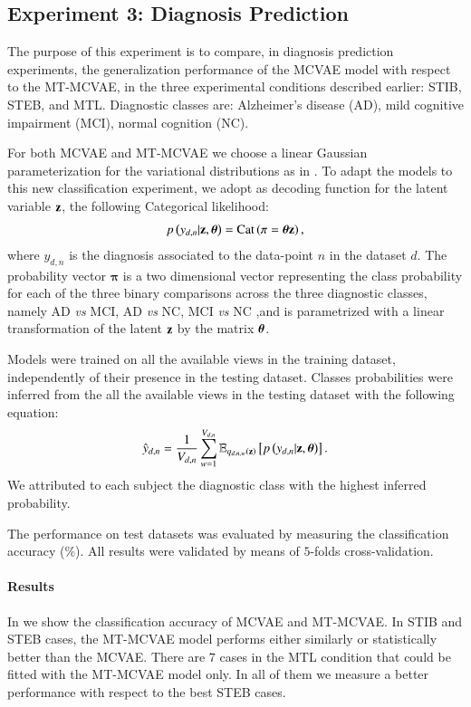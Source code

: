 \subsection{Experiment 3: Diagnosis Prediction}
\label{ssec:classifier}


The purpose of this experiment is to compare, in diagnosis prediction experiments, the generalization performance of the MCVAE model with respect to the MT-MCVAE,
in the three experimental conditions described earlier: STIB, STEB, and MTL.
%
Diagnostic classes are:
Alzheimer's disease (AD),
mild cognitive impairment (MCI),
normal cognition (NC).

For both MCVAE and MT-MCVAE we choose a linear Gaussian parameterization for the variational distributions as in .
To adapt the models to this new classification experiment, we adopt as decoding function for the latent variable $\mathbf{z}$, the following Categorical likelihood:
\begin{align}
\label{eq:classifier}
p\left(y_{d,n}|\mathbf{z},\boldsymbol{\theta}\right) = \operatorname{Cat}\left(\mathbf{\pi}=\boldsymbol{\theta}\mathbf{z}\right),
\end{align}
where $y_{d,n}$ is the diagnosis associated to the data-point $n$ in the dataset $d$.
The probability vector $\mathbf{\pi}$ is a two dimensional vector representing the class probability for each of the three binary comparisons across the three diagnostic classes, namely AD \textit{vs} MCI, AD \textit{vs} NC, MCI \textit{vs} NC ,and is parametrized with a linear transformation of the latent $\mathbf{z}$ by the matrix $\boldsymbol{\theta}$.

Models were trained on all the available views in the training dataset, independently of their presence in the testing dataset.
Classes probabilities were inferred from the all the available views in the testing dataset with the following equation:
\begin{equation}\label{eq:reconstructiony}
\begin{aligned}
\hat{y}_{d,n} = \frac{1}{V_{d, n}} \sum_{w=1}^{V_{d, n}} \operatorname{\mathbb{E}}_{q_{d,n,w}(\mathbf{z})}\left[p\left(y_{d,n}|\mathbf{z},\boldsymbol{\theta}\right)\right].
\end{aligned}
\end{equation}
We attributed to each subject the diagnostic class with the highest inferred probability.

The performance on test datasets was evaluated by measuring the classification accuracy (\%).
All results were validated by means of $5$-folds cross-validation.

\paragraph{Results}
In  we show the classification accuracy of MCVAE and MT-MCVAE.
In STIB and STEB cases, the MT-MCVAE model performs either similarly or statistically better than the MCVAE.
There are $7$ cases in the MTL condition  that could be fitted with the MT-MCVAE model only.
In all of them we measure a better performance with respect to the best STEB cases.

